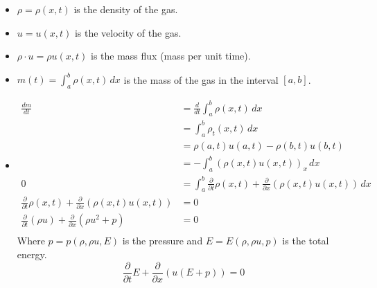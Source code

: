 \begin{itemize}
  \item \(\rho = \rho(x,t)\) is the density of the gas.
  \item \(u = u(x,t)\) is the velocity of the gas.
  \item \(\rho \cdot u = \rho u(x,t)\) is the mass flux (mass per unit time).
  \item \(m(t) = \int_{a}^{b} \rho(x,t) \, dx\) is the mass of the gas in the interval \([a,b]\).
  \item
        \begin{align*}
          \frac{dm}{dt}                                                                       & = \frac{d}{dt} \int_{a}^{b} \rho(x,t) \, dx                                                                \\
                                                                                              & = \int_{a}^{b} \rho_t(x,t) \, dx                                                                           \\
                                                                                              & = \rho(a,t)u(a,t) - \rho(b,t)u(b,t)                                                                        \\
                                                                                              & = -\int_{a}^{b} (\rho(x,t)u(x,t))_x \, dx                                                                  \\
          0                                                                                   & = \int_{a}^{b} \tfrac{\partial}{\partial t}\rho(x,t) + \tfrac{\partial}{\partial x}(\rho(x,t)u(x,t)) \, dx \\
          \frac{\partial}{\partial t}\rho(x,t) + \frac{\partial}{\partial x}(\rho(x,t)u(x,t)) & = 0 \tag{Conservation of mass}                                                                             \\
          \frac{\partial}{\partial t}(\rho u) + \frac{\partial}{\partial x}(\rho u^2 + p)     & = 0 \tag{Conservation of momentum}                                                                         \\
        \end{align*}
        Where \(p = p(\rho, \rho u, E)\) is the pressure and \(E = E(\rho, \rho u, p)\) is the total energy.
        \[
          \frac{\partial}{\partial t}E + \frac{\partial}{\partial x}(u(E + p)) = 0 \tag{Conservation of energy}
\]
\end{itemize}
